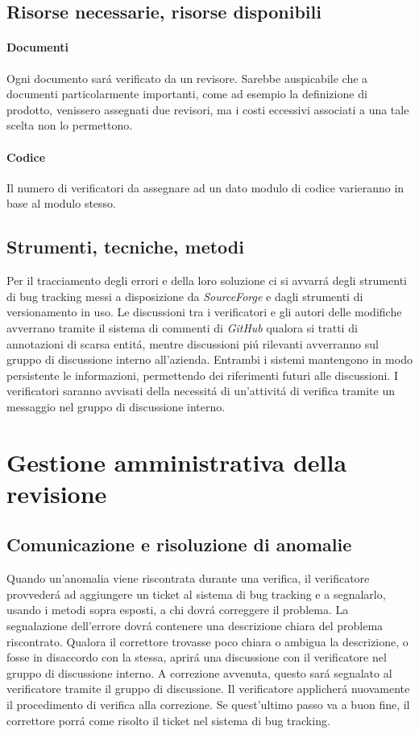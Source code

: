 \documentclass[a4paper]{article}
\begin{document}
\subsection{Risorse necessarie, risorse disponibili}
\paragraph{Documenti} Ogni documento sar\'a verificato da un revisore. Sarebbe auspicabile che a documenti particolarmente importanti, come ad esempio la definizione di prodotto, venissero assegnati due revisori, ma i costi eccessivi associati a una tale scelta non lo permettono.
\paragraph{Codice} Il numero di verificatori da assegnare ad un dato modulo di codice varieranno in base al modulo stesso.

\subsection{Strumenti, tecniche, metodi}
Per il tracciamento degli errori e della loro soluzione ci si avvarr\'a degli strumenti di bug tracking messi a disposizione da \textit{SourceForge} e dagli strumenti di versionamento in uso. \linebreak
Le discussioni tra i verificatori e gli autori delle modifiche avverrano tramite il sistema di commenti di \textit{GitHub} qualora si tratti di annotazioni di scarsa entit\'a, mentre discussioni pi\'u rilevanti avverranno sul gruppo di discussione interno all'azienda. Entrambi i sistemi mantengono in modo persistente le informazioni, permettendo dei riferimenti futuri alle discussioni.
\linebreak
I verificatori saranno avvisati della necessit\'a di un'attivit\'a di verifica tramite un messaggio nel gruppo di discussione interno. 


\section{Gestione amministrativa della revisione}

\subsection{Comunicazione e risoluzione di anomalie}
Quando un'anomalia viene riscontrata durante una verifica, il verificatore provveder\'a ad aggiungere un ticket al sistema di bug tracking e a segnalarlo, usando i metodi sopra esposti, a chi dovr\'a correggere il problema. La segnalazione dell'errore dovr\'a contenere una descrizione chiara del problema riscontrato. Qualora il correttore trovasse poco chiara o ambigua la descrizione, o fosse in disaccordo con la stessa, aprir\'a una discussione con il verificatore nel gruppo di discussione interno. A correzione avvenuta, questo sar\'a segnalato al verificatore tramite il gruppo di discussione. Il verificatore applicher\'a nuovamente il procedimento di verifica alla correzione. Se quest'ultimo passo va a buon fine, il correttore porr\'a come risolto il ticket nel sistema di bug tracking.
\end{document}
